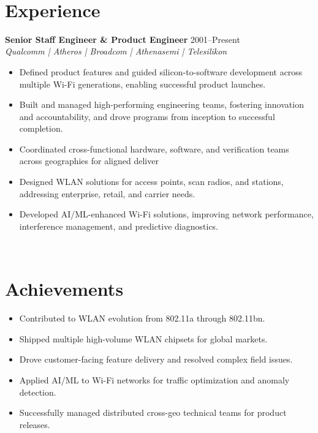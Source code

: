 \documentclass[a4paper,11pt]{article}
\begin{document}
\mbox{} \\

\section*{Experience}
\textbf{Senior Staff Engineer \& Product Engineer} \hfill 2001--Present \\
\textit{Qualcomm | Atheros | Broadcom | Athenasemi | Telesilikon} \\
\begin{itemize}
    \item Defined product features and guided silicon-to-software development across multiple Wi-Fi generations, enabling successful product launches.
    \item Built and managed high-performing engineering teams, fostering innovation and accountability, and drove programs from inception to successful completion.
    \item Coordinated cross-functional hardware, software, and verification teams across geographies for aligned deliver
    \item Designed WLAN solutions for access points, scan radios, and stations, addressing enterprise, retail, and carrier needs.
    \item Developed AI/ML-enhanced Wi-Fi solutions, improving network performance, interference management, and predictive diagnostics.
\end{itemize}

\mbox{} \\

\section*{Achievements}
\begin{itemize}
    \item Contributed to WLAN evolution from 802.11a through 802.11bn.
    \item Shipped multiple high-volume WLAN chipsets for global markets.
    \item Drove customer-facing feature delivery and resolved complex field issues.
    \item Applied AI/ML to Wi-Fi networks for traffic optimization and anomaly detection.
    \item Successfully managed distributed cross-geo technical teams for product releases.
\end{itemize}
\end{document}
